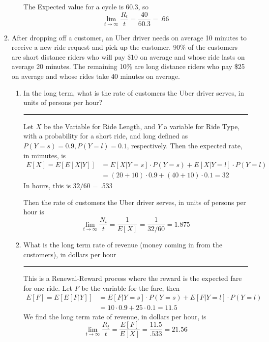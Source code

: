\documentclass{article} %
\theoremstyle{plain}
\theoremstyle{case}
\begin{document}
\begin{enumerate}[label={\fbox{\textbf{Exercise \#\arabic* :}}}]
\begin{enumerate}
       The Expected value for a cycle is 60.3,
       so
       \[ \lim_{t \to \infty} \frac{R_t}{t} = \frac{40}{60.3} = .66 \]
    \end{enumerate}
  \newpage
  \item After dropping off a customer, an Uber driver needs on average 10
    minutes to receive a new ride request and pick up the customer.
    90\% of the customers are short distance riders who will pay
    \$10 on average and whose ride lasts on average 20 minutes.
    The remaining 10\% are long distance riders who pay \$25 on
    average and whose rides take 40 minutes on average.
    \begin{enumerate}
      \item In the long term, what is the rate of customers the Uber driver serves, in units of persons per hour?
\par\noindent\rule{\textwidth}{0.1pt}
        Let $X$ be the Variable for Ride Length, and $Y$ a variable for
        Ride Type, with a probability for a short ride, and long 
        defined as $P(Y=s) = 0.9, P(Y=l) = 0.1$, respectively.  Then
        the expected rate, in mimutes, is
       \begin{align*}
         E[X] = E[E[X|Y]] &= E[X|Y=s] \cdot P(Y=s) + E[X|Y=l] \cdot P(Y=l) \\
                          &= (20+10) \cdot 0.9 + (40+10) \cdot 0.1 = 32
       \end{align*}
       In hours, this is $32/60$ = .533

       Then the rate of customers the Uber driver serves, in units of persons per hour is
       \[ \lim_{t \to \infty} \frac{N_t}{t}  = \frac{1}{E[X]}  = \frac{1}{32/60} = 1.875 \]
     \item What is the long term rate of revenue (money coming in from the customers), in dollars per hour
\par\noindent\rule{\textwidth}{0.1pt}
        This is a Renewal-Reward process where the reward is the expected
        fare for one ride.  Let $F$ be the variable for the fare, then
       \begin{align*}
         E[F] = E[E[F|Y]] &=E[F|Y=s] \cdot P(Y=s) +E[F|Y=l] \cdot P(Y=l) \\
                          &= 10 \cdot 0.9 + 25 \cdot 0.1 = 11.5
       \end{align*}
        We find the long term rate of revenue, in dollars per hour, is
        \[ \lim_{t \to \infty} \frac{R_t}{t} = \frac{E[F]}{E[X]} = \frac{11.5}{.533} = 21.56 \]
    \end{enumerate}


\end{enumerate}
\end{document}
